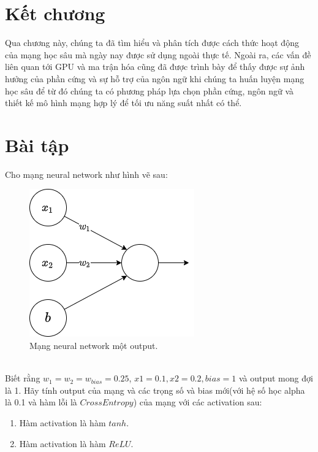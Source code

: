 \section{Kết chương}
 Qua chương này, chúng ta đã tìm hiểu và phân tích được cách thức hoạt động của mạng học sâu mà ngày nay được sử dụng ngoài thực tế. Ngoài ra, các vấn đề liên quan tới GPU và ma trận hóa cũng đã được trình bày để thấy được sự ảnh hưởng của phần cứng và sự hỗ trợ của ngôn ngữ khi chúng ta huấn luyện mạng học sâu để từ đó chúng ta có phương pháp lựa chọn phần cứng, ngôn ngữ và thiết kế mô hình mạng hợp lý để tối ưu năng suất nhất có thể.

\newpage
\section{Bài tập}
\begin{exer}
Cho mạng neural network như hình vẽ sau:
\begin{figure}[!h]
	\centering
		\includegraphics[width=0.5\columnwidth]{chapter03/figure/bai1.png}
        \caption{Mạng neural network một output.}
		\centering
\end{figure}\\
Biết rằng $w_{1} = w_{2} = w_{bias} = 0.25$, $x1=0.1, x2=0.2, bias= 1$ và output mong đợi là 1. Hãy tính output của mạng và các trọng số và bias mới(với hệ số học alpha là 0.1 và hàm lỗi là $CrossEntropy$) của mạng với các activation sau:
\begin{enumerate}
    \item Hàm activation là hàm $tanh$.
    \item Hàm activation là hàm $ReLU$.
\end{enumerate}
\end{exer}

